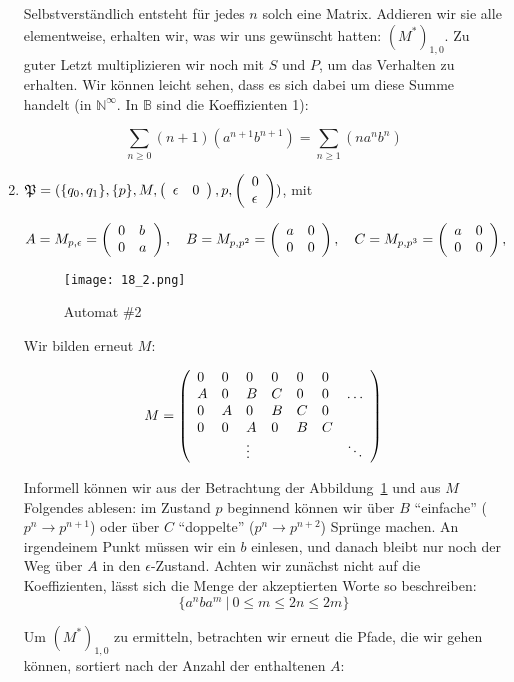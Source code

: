 \documentclass[]{scrartcl}
\newcommand{\matr}[2]{\left(\begin{array}{#1}#2\end{array}\right)}
\begin{document}
\begin{enumerate}
	Selbstverständlich entsteht für jedes $n$ solch eine Matrix. Addieren wir sie alle elementweise, erhalten wir, was wir uns gewünscht hatten: $(M^*)_{1,0}$. Zu guter Letzt multiplizieren wir noch mit $S$ und $P$, um das Verhalten zu erhalten. Wir können leicht sehen, dass es sich dabei um diese Summe handelt (in $\mathbb{N}^\infty$. In $\mathbb{B}$ sind die Koeffizienten 1):
	
	$$
		\sum\limits_{n \geq 0} (n+1)(a^{n+1}b^{n+1}) = \sum\limits_{n \geq 1} (na^{n}b^{n})
	$$
	
	\item $
			\mathfrak{P} = (\{q_0,q_1\}, \{p\}, M, \matr{l l}{\epsilon & 0}, p, \matr{l}{0\\\epsilon})
		$, mit

		$$
			A = M_{p,\epsilon} = \matr{l l}{0 & b\\
											  0 & a}, 
	\quad
			B = M_{p,p^2} = \matr{l l}{a & 0\\
									   0 & 0}, 
	\quad
			C = M_{p,p^3} = \matr{l l}{a & 0\\
									    0 & 0}, 
		$$
		
		\begin{figure}[h]
			\centering
			\texttt{[image: 18\_2.png]}
			\caption{Automat \#2}
			\label{aut2}
		\end{figure}
		
		\newpage
		
		Wir bilden erneut $M$:
		
	$$
		M = \matr{l l l l l l l}{0 & 0 & 0 & 0 & 0 & 0 & \\
							   A & 0 & B & C & 0 & 0 & \dots\\
							   0 & A & 0 & B & C & 0 & \\
							   0 & 0 & A & 0 & B & C & \\
							     &   & \vdots & & & & \ddots}
	$$
		
	Informell können wir aus der Betrachtung der Abbildung~\ref{aut2} und aus $M$ Folgendes ablesen: im Zustand $p$ beginnend können wir über $B$ ``einfache'' ($p^n \rightarrow p^{n+1}$) oder über $C$ ``doppelte'' ($p^n \rightarrow p^{n+2}$) Sprünge machen. An irgendeinem Punkt müssen wir ein $b$ einlesen, und danach bleibt nur noch der Weg über $A$ in den $\epsilon$-Zustand. Achten wir zunächst nicht auf die Koeffizienten, lässt sich die Menge der akzeptierten Worte so beschreiben:
	$$
		\{a^nba^m \ |\ 0\leq m \leq 2n \leq 2m \}
	$$
	
	Um $(M^*)_{1,0}$ zu ermitteln, betrachten wir erneut die Pfade, die wir gehen können, sortiert nach der Anzahl der enthaltenen $A$:
	

\end{enumerate}
\end{document}
